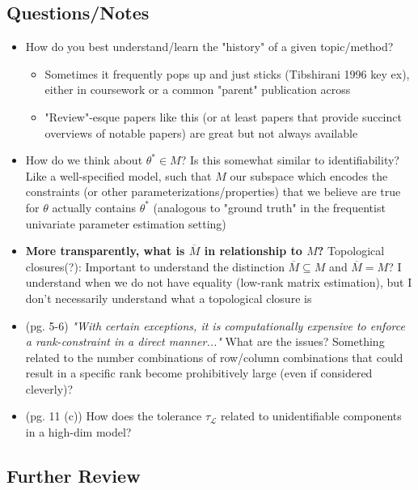 \documentclass[11pt]{article}
\begin{document}
\subsection*{Questions/Notes}

	\begin{itemize}
		\item How do you best understand/learn the "history" of a given topic/method?
		\begin{itemize}
			\item Sometimes it frequently pops up and just sticks (Tibshirani 1996 key ex), either in coursework or a common "parent" publication across 
			\item "Review"-esque papers like this (or at least papers that provide succinct overviews of notable papers) are great but not always available
        \end{itemize}
        \item  How do we think about $\theta^* \in M$? Is this somewhat similar to identifiability? Like a well-specified model, such that $M$ our subspace which encodes the constraints (or other parameterizations/properties) that we believe are true for $\theta$ actually contains $\theta^*$ (analogous to "ground truth" in the frequentist univariate parameter estimation setting)
		\item {\bf More transparently, what is $\overline{M}$ in relationship to $M$?} Topological closures(?): Important to understand the distinction $\overline{M} \subseteq M$ and $\overline{M} = M$? I understand when we do not have equality (low-rank matrix estimation), but I don't necessarily understand what a topological closure is 
		\item (pg. 5-6) {\it "With certain exceptions, it is computationally expensive to enforce a rank-constraint in a direct manner..."} What are the issues? Something related to the number combinations of row/column combinations that could result in a specific rank become prohibitively large (even if considered cleverly)? 
		\item (pg. 11 (c)) How does the tolerance $\tau_\mathcal{L}$ related to unidentifiable components in a high-dim model? 
	\end{itemize}

\subsection*{Further Review}
\end{document}
